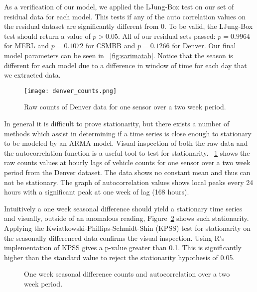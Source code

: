 As a verification of our model, we applied the LJung-Box test \cite{Ljung1978} on our set of residual data for each model.  This tests if any of the auto correlation values on the residual dataset are significantly different from 0.  To be valid, the LJung-Box test should return a value of $p > 0.05$.  All of our residual sets passed: $p = 0.9964$ for MERL and $p = 0.1072$ for CSMBB and $p = 0.1266$ for Denver.  Our final model parameters can be seen in ~\ref{fig:sarimatab}.  Notice that the season is different for each model due to a difference in window of time for each day that we extracted data.

\begin{figure}[]
	\begin{center}
		\texttt{[image: denver\_counts.png]}
	\end{center}
	\caption{Raw counts of Denver data for one sensor over a two week period.}
	\label{fig:denver_raw_data}
\end{figure}

In general it is difficult to prove stationarity, but there exists a number of methods which assist in determining if a time series is close enough to stationary to be modeled by an ARMA model.  Visual inspection of both the raw data and the autocorrelation function is a useful tool to test for stationarity.  ~\ref{fig:denver_raw_data} shows the raw counts values at hourly lags of vehicle counts for one sensor over a two week period from the Denver dataset.  The data shows no constant mean and thus can not be stationary.  The graph of autocorrelation values shows local peaks every 24 hours with a significant peak at one week of lag (168 hours).

Intuitively a one week seasonal difference should yield a stationary time series and visually, outside of an anomalous reading, Figure~\ref{fig:lag_data} shows such stationarity.  Applying the Kwiatkowski-Phillips-Schmidt-Shin (KPSS) \cite{Kwiatkowski1992} test for stationarity on the seasonally differenced data confirms the visual inspection.  Using R's implementation of KPSS gives a p-value greater than 0.1.  This is significantly higher than the standard value to reject the stationarity hypothesis of 0.05.  

\begin{figure}[t]
\begin{center}
\end{center}
\caption{One week seasonal difference counts and autocorrelation over a two week period.}
\label{fig:lag_data}
\end{figure}

